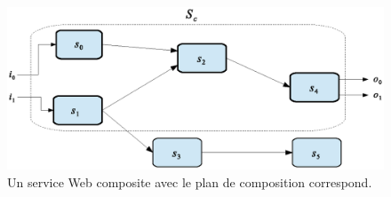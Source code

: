 \begin{figure}[h]
    \centering
    \includegraphics[width=1.1\textwidth]{figs/ch4/composition-plan.eps}
    \caption{Un service Web composite avec le plan de composition correspond.}
    \label{fig:ch4/composition-plan}
\end{figure}

